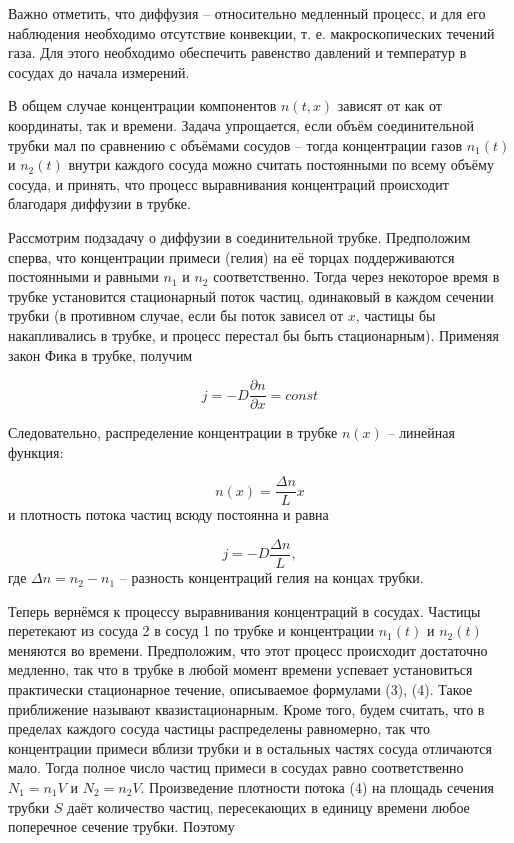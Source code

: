 \documentclass[12pt,a4paper]{article}
\begin{document}
Важно отметить, что диффузия -- относительно медленный процесс, и для его наблюдения необходимо отсутствие конвекции, т. е. макроскопических течений газа. Для этого необходимо обеспечить равенство давлений и температур в сосудах до начала измерений.

В общем случае концентрации компонентов $ n(t, x) $ зависят от как от координаты, так и времени. Задача упрощается, если объём соединительной трубки мал по сравнению с объёмами сосудов -- тогда концентрации газов $ n_1(t) $ и $ n_2(t) $ внутри каждого сосуда можно считать постоянными по всему объёму сосуда, и принять, что процесс выравнивания концентраций происходит благодаря диффузии в трубке.

Рассмотрим подзадачу о диффузии в соединительной трубке. Предположим сперва, что концентрации примеси (гелия) на её торцах поддерживаются постоянными и равными $ n_1 $ и $ n_2 $ соответственно. Тогда через некоторое время в трубке установится стационарный поток частиц, одинаковый в каждом сечении трубки (в противном случае, если бы поток зависел от $ x $, частицы бы накапливались в трубке, и процесс перестал бы быть стационарным). Применяя закон Фика в трубке, получим

\[ j=-D\frac{\partial n}{\partial x} = const \]

Следовательно, распределение концентрации в трубке $ n(x) $ -- линейная
функция:

\begin{equation}
n(x) = \frac{\Delta n}{L} x
\end{equation}
и плотность потока частиц всюду постоянна и равна

\begin{equation}
j=-D\frac{\Delta n}{L},
\end{equation}
где $ \Delta n = n_2-n_1 $ -- разность концентраций гелия на концах трубки.

Теперь вернёмся к процессу выравнивания концентраций в сосудах. Частицы перетекают из сосуда 2 в сосуд 1 по трубке и концентрации $ n_1(t) $ и $ n_2(t) $ меняются во времени. Предположим, что этот процесс происходит достаточно медленно, так что в трубке в любой момент времени успевает установиться практически стационарное течение, описываемое формулами (3), (4). Такое приближение называют квазистационарным. Кроме того, будем считать, что в пределах каждого сосуда частицы распределены равномерно, так что концентрации примеси вблизи трубки и в остальных частях сосуда отличаются мало. Тогда полное число частиц примеси в сосудах равно соответственно $ N_1=n_1V $ и $ N_2=n_2V $. Произведение плотности потока (4) на площадь сечения трубки $ S $ даёт количество частиц, пересекающих в единицу времени любое поперечное сечение трубки. Поэтому
\end{document}
